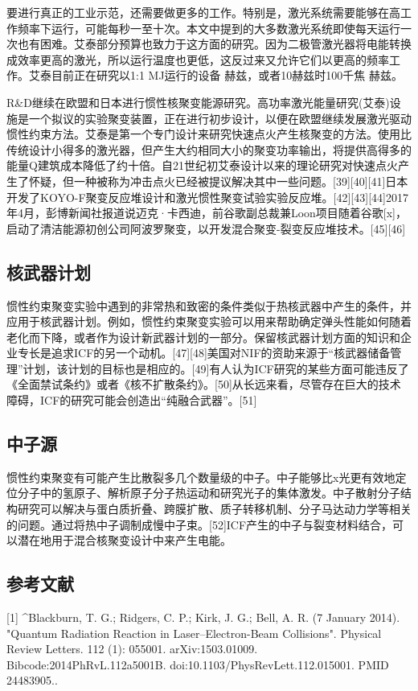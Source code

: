 要进行真正的工业示范，还需要做更多的工作。特别是，激光系统需要能够在高工作频率下运行，可能每秒一至十次。本文中提到的大多数激光系统即使每天运行一次也有困难。艾泰部分预算也致力于这方面的研究。因为二极管激光器将电能转换成效率更高的激光，所以运行温度也更低，这反过来又允许它们以更高的频率工作。艾泰目前正在研究以1:1 MJ运行的设备 赫兹，或者10赫兹时100千焦 赫兹。

R&D继续在欧盟和日本进行惯性核聚变能源研究。高功率激光能量研究(艾泰)设施是一个拟议的实验聚变装置，正在进行初步设计，以便在欧盟继续发展激光驱动惯性约束方法。艾泰是第一个专门设计来研究快速点火产生核聚变的方法。使用比传统设计小得多的激光器，但产生大约相同大小的聚变功率输出，将提供高得多的能量Q建筑成本降低了约十倍。自21世纪初艾泰设计以来的理论研究对快速点火产生了怀疑，但一种被称为冲击点火已经被提议解决其中一些问题。[39][40][41]日本开发了KOYO-F聚变反应堆设计和激光惯性聚变试验实验反应堆。[42][43][44]2017年4月，彭博新闻社报道说迈克·卡西迪，前谷歌副总裁兼Loon项目随着谷歌[x]，启动了清洁能源初创公司阿波罗聚变，以开发混合聚变-裂变反应堆技术。[45][46]

\subsection{核武器计划}
惯性约束聚变实验中遇到的非常热和致密的条件类似于热核武器中产生的条件，并应用于核武器计划。例如，惯性约束聚变实验可以用来帮助确定弹头性能如何随着老化而下降，或者作为设计新武器计划的一部分。保留核武器计划方面的知识和企业专长是追求ICF的另一个动机。[47][48]美国对NIF的资助来源于“核武器储备管理”计划，该计划的目标也是相应的。[49]有人认为ICF研究的某些方面可能违反了《全面禁试条约》或者《核不扩散条约》。[50]从长远来看，尽管存在巨大的技术障碍，ICF的研究可能会创造出“纯融合武器”。[51]

\subsection{中子源}
惯性约束聚变有可能产生比散裂多几个数量级的中子。中子能够比x光更有效地定位分子中的氢原子、解析原子分子热运动和研究光子的集体激发。中子散射分子结构研究可以解决与蛋白质折叠、跨膜扩散、质子转移机制、分子马达动力学等相关的问题。通过将热中子调制成慢中子束。[52]ICF产生的中子与裂变材料结合，可以潜在地用于混合核聚变设计中来产生电能。

\subsection{参考文献}
[1]
^Blackburn, T. G.; Ridgers, C. P.; Kirk, J. G.; Bell, A. R. (7 January 2014). "Quantum Radiation Reaction in Laser–Electron-Beam Collisions". Physical Review Letters. 112 (1): 055001. arXiv:1503.01009. Bibcode:2014PhRvL.112a5001B. doi:10.1103/PhysRevLett.112.015001. PMID 24483905..

